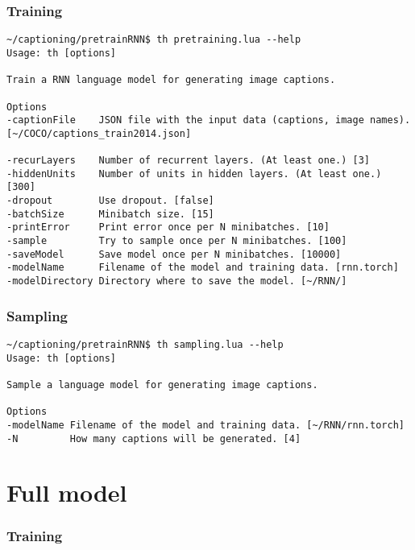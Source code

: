 \subsubsection{Training}

\begin{lstlisting}[firstnumber=1,breakindent=75pt]
~/captioning/pretrainRNN$ th pretraining.lua --help  
Usage: th [options] 

Train a RNN language model for generating image captions.

Options
-captionFile    JSON file with the input data (captions, image names). [~/COCO/captions_train2014.json]

-recurLayers    Number of recurrent layers. (At least one.) [3]
-hiddenUnits    Number of units in hidden layers. (At least one.) [300]
-dropout        Use dropout. [false]
-batchSize      Minibatch size. [15]
-printError     Print error once per N minibatches. [10]
-sample         Try to sample once per N minibatches. [100]
-saveModel      Save model once per N minibatches. [10000]
-modelName      Filename of the model and training data. [rnn.torch]
-modelDirectory Directory where to save the model. [~/RNN/]
\end{lstlisting}
\hspace{1cm}

\subsubsection{Sampling}

\begin{lstlisting}[firstnumber=1,breakindent=75pt]
~/captioning/pretrainRNN$ th sampling.lua --help
Usage: th [options] 

Sample a language model for generating image captions.

Options
-modelName Filename of the model and training data. [~/RNN/rnn.torch]
-N         How many captions will be generated. [4]
\end{lstlisting}
\hspace{1cm}

\section{Full model}

\subsubsection{Training}

